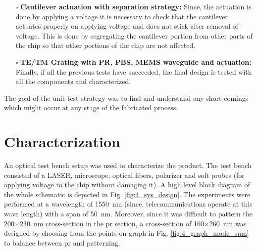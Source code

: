 \documentclass[../report.tex]{subfiles}
\begin{document}
\begin{itemize}[leftmargin=*]
		\item[$\square$] \textbf{Cantilever actuation with separation strategy:} Since, the actuation is done by applying a voltage it is necessary to check that the cantilever actuates properly on applying voltage and does not stick after removal of voltage. This is done by segregating the cantilever portion from other parts of the chip so that other portions of the chip are not affected. 
		
		\item[$\square$] \textbf{TE/TM Grating with PR, PBS, MEMS waveguide and actuation:} Finally, if all the previous tests have succeeded, the final design is tested with all the components and characterized.
	\end{itemize}
	
	\noindent The goal of the unit test strategy was to find and understand any short-comings which might occur at any stage of the fabricated process.
	
	\section{Characterization}
	An optical test bench setup was used to characterize the product. The test bench consisted of a LASER, microscope, optical fibers, polarizer and soft probes (for applying voltage to the chip without damaging it). A high level block diagram of the whole schematic is depicted in Fig. \ref{fig:4_sys_design}. The experiments were performed at a wavelength of \SI{1550}{\nano \meter} (since, telecommunications operate at this wave length) with a span of \SI{50}{\nano \meter}. Moreover, since it was difficult to pattern the 200$\times$\SI{230}{\nano \meter} cross-section in the \gls{pr} section, a cross-section of 160$\times$\SI{260}{\nano \meter} was designed by choosing from the points on graph in Fig. \ref{fig:4_graph_mode_sum} to balance between \gls{pr} and patterning.
\end{document}
